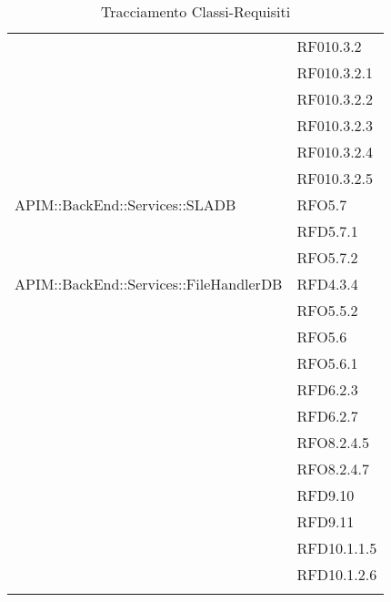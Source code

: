 \begin{longtable}{ p{12cm} | p{4cm} }
	& RF010.3.2 \\
	& RF010.3.2.1 \\
	& RF010.3.2.2 \\
	& RF010.3.2.3 \\
	& RF010.3.2.4 \\
	& RF010.3.2.5 \\
	\hline
	APIM::BackEnd::Services::SLADB
	& RFO5.7 \\
	& RFD5.7.1 \\
	& RFO5.7.2 \\
	\hline
	APIM::BackEnd::Services::FileHandlerDB
	& RFD4.3.4 \\
	& RFO5.5.2 \\
	& RFO5.6 \\
	& RFO5.6.1 \\
	& RFD6.2.3 \\
	& RFD6.2.7 \\
	& RFO8.2.4.5 \\
	& RFO8.2.4.7 \\
	& RFD9.10 \\
	& RFD9.11 \\
	& RFD10.1.1.5 \\
	& RFD10.1.2.6 \\
	\hline
	
	\caption{Tracciamento Classi-Requisiti}
\end{longtable}


\newpage
